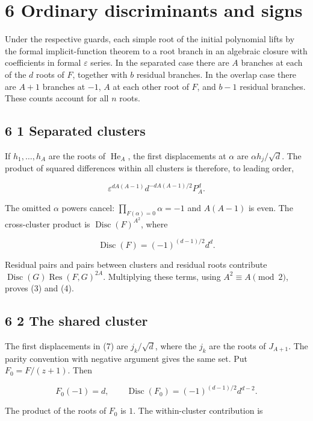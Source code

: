 \documentclass[
  11pt,
]{article}
\begin{document}
\section{6 Ordinary discriminants and
signs}\label{ordinary-discriminants-and-signs}

Under the respective guards, each simple root of the initial polynomial
lifts by the formal implicit-function theorem to a root branch in an
algebraic closure with coefficients in formal \(\varepsilon\) series. In
the separated case there are \(A\) branches at each of the \(d\) roots
of \(F\), together with \(b\) residual branches. In the overlap case
there are \(A+1\) branches at \(-1\), \(A\) at each other root of \(F\),
and \(b-1\) residual branches. These counts account for all \(n\) roots.

\subsection{6 1 Separated clusters}\label{separated-clusters}

If \(h_1,\ldots,h_A\) are the roots of \(\operatorname{He}_A\), the
first displacements at \(\alpha\) are \(\alpha h_j/\sqrt d\). The
product of squared differences within all clusters is therefore, to
leading order,

\[
\varepsilon^{dA(A-1)}d^{-dA(A-1)/2}P_A^d. \tag{21}
\]

The omitted \(\alpha\) powers cancel: \(\prod_{F(\alpha)=0}\alpha=-1\)
and \(A(A-1)\) is even. The cross-cluster product is
\(\operatorname{Disc}(F)^{A^2}\), where

\[
\operatorname{Disc}(F)=(-1)^{(d-1)/2}d^d. \tag{22}
\]

Residual pairs and pairs between clusters and residual roots contribute
\(\operatorname{Disc}(G)\operatorname{Res}(F,G)^{2A}\). Multiplying
these terms, using \(A^2\equiv A\pmod2\), proves (3) and (4).

\subsection{6 2 The shared cluster}\label{the-shared-cluster}

The first displacements in (7) are \(j_k/\sqrt d\), where the \(j_k\)
are the roots of \(J_{A+1}\). The parity convention with negative
argument gives the same set. Put \(F_0=F/(z+1)\). Then

\[
F_0(-1)=d,\qquad
\operatorname{Disc}(F_0)=(-1)^{(d-1)/2}d^{d-2}.
\]

The product of the roots of \(F_0\) is \(1\). The within-cluster
contribution is
\end{document}
